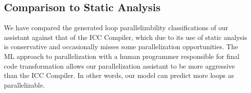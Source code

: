 \subsection{Comparison to Static Analysis} 

We have compared the generated loop parallelizability classifications of our assistant against that of the ICC Compiler, which due to its use of static analysis is conservative and occasionally misses some parallelization opportunities. The ML approach to parallelization with a human programmer responsible for final code transformation allows our parallelization assistant to be more aggressive than the ICC Compiler. In other words, our model can predict more loops as parallelizable. 

